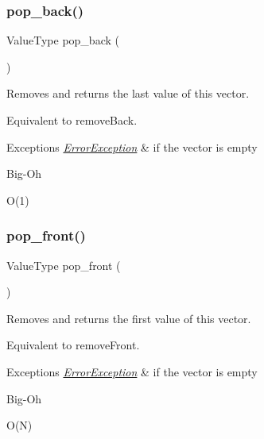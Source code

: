 \subsubsection{\texorpdfstring{pop\+\_\+back()}{pop\_back()}}
{\footnotesize\ttfamily Value\+Type pop\+\_\+back (\begin{DoxyParamCaption}{ }\end{DoxyParamCaption})}



Removes and returns the last value of this vector. 

Equivalent to remove\+Back. 
\begin{DoxyExceptions}{Exceptions}
{\em \mbox{\hyperlink{classErrorException}{Error\+Exception}}} & if the vector is empty \\
\hline
\end{DoxyExceptions}
\begin{DoxyRefDesc}{Big-\/\+Oh}
\item[\mbox{\hyperlink{BigOh__BigOh000123}{Big-\/\+Oh}}]O(1) \end{DoxyRefDesc}
\mbox{\label{classVector_aacdba74afa1be07d1046ece9e0512c77}} 
\subsubsection{\texorpdfstring{pop\+\_\+front()}{pop\_front()}}
{\footnotesize\ttfamily Value\+Type pop\+\_\+front (\begin{DoxyParamCaption}{ }\end{DoxyParamCaption})}



Removes and returns the first value of this vector. 

Equivalent to remove\+Front. 
\begin{DoxyExceptions}{Exceptions}
{\em \mbox{\hyperlink{classErrorException}{Error\+Exception}}} & if the vector is empty \\
\hline
\end{DoxyExceptions}
\begin{DoxyRefDesc}{Big-\/\+Oh}
\item[\mbox{\hyperlink{BigOh__BigOh000122}{Big-\/\+Oh}}]O(\+N) \end{DoxyRefDesc}
\mbox{\label{classVector_a8ff6f18ca45e769f2f8c7a0bcf79fad9}} 
